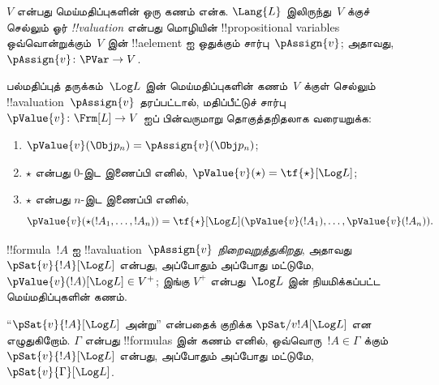 \documentclass[../../../include/open-logic-section]{subfiles}
\begin{document}


\begin{defn}[!!^{valuation}s]
$V$ என்பது மெய்மதிப்புகளின் ஒரு கணம் என்க. $\Lang{L}$ இலிருந்து~$V$
க்குச் செல்லும் ஓர் \emph{!!{valuation}} என்பது மொழியின்
!!{propositional variable}s ஒவ்வொன்றுக்கும்~$V$ இன் !!a{element} ஐ
ஒதுக்கும் சார்பு~$\pAssign{v}$; அதாவது, $\pAssign{v} \colon
\PVar \to V$.
\end{defn}

\begin{defn}
  பல்மதிப்புத் தருக்கம்~$\Log L$ இன் மெய்மதிப்புகளின் கணம்~$V$ க்குள்
  செல்லும் !!a{valuation}~$\pAssign{v}$ தரப்பட்டால், மதிப்பீட்டுச் சார்பு
  $\pValue{v} \colon \Frm[L] \to V$ ஐப் பின்வருமாறு தொகுத்தறிதலாக
  வரையறுக்க:
  \begin{enumerate}
    \item $\pValue{v}(\Obj p_n) = \pAssign{v}(\Obj p_n)$;
    \item $\star$ என்பது $0$-இட இணைப்பி எனில்,
    $\pValue{v}(\star)  = \tf{\star}[\Log L]$;
    \item $\star$ என்பது $n$-இட இணைப்பி எனில்,
    \[
      \pValue{v}(\star(!A_1, \dots, !A_n)) = \tf{\star}[\Log L]
      (\pValue{v}(!A_1), \dots, \pValue{v}(!A_n)).
    \]
  \end{enumerate}
\end{defn}

\begin{defn}[நிறைவுறுத்தல்]
 !!{formula}~$!A$ ஐ
  !!a{valuation}~$\pAssign{v}$ \emph{நிறைவுறுத்துகிறது}, அதாவது
  $\pSat{v}{!A}[\Log L]$ என்பது, அப்போதும் அப்போது மட்டுமே,
  $\pValue{v}(!A)[\Log L] \in V^+$; இங்கு $V^+$ என்பது~$\Log L$ இன்
  நியமிக்கப்பட்ட மெய்மதிப்புகளின் கணம்.

  ``$\pSat{v}{!A}[\Log L]$ அன்று'' என்பதைக் குறிக்க
  $\pSat/{v}{!A}[\Log L]$ என எழுதுகிறோம். $\Gamma$ என்பது
  !!{formula}s இன் கணம் எனில், ஒவ்வொரு~$!A \in \Gamma$ க்கும்
  $\pSat{v}{!A}[\Log L]$ என்பது, அப்போதும் அப்போது மட்டுமே,
  $\pSat{v}{\Gamma}[\Log L]$.
\end{defn}
\end{document}

